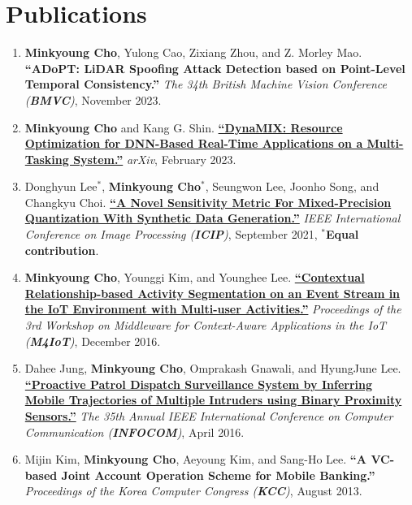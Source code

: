 \documentclass[letterpaper,oneside,11pt]{article}
\begin{document}
\section{Publications}
\begin{enumerate}[leftmargin=*, itemsep=0em]
  \item \small \textbf{Minkyoung Cho}, Yulong Cao, Zixiang Zhou, and Z. Morley Mao.  \textbf{``ADoPT: LiDAR Spoofing Attack Detection based on Point-Level Temporal Consistency.''} \textit{The 34th British Machine Vision Conference (\textbf{BMVC})}, November 2023.
  \item \small \textbf{Minkyoung Cho} and Kang G. Shin.  \textbf{\href{https://arxiv.org/abs/2302.01568}{``DynaMIX: Resource Optimization for DNN-Based Real-Time Applications on a Multi-Tasking System.''}} \textit{arXiv}, February 2023.
  \item \small Donghyun Lee$^\ast$, \textbf{Minkyoung Cho$^\ast$}, Seungwon Lee, Joonho Song, and Changkyu Choi.  \textbf{\href{https://ieeexplore.ieee.org/abstract/document/9506527}{``A Novel Sensitivity Metric For Mixed-Precision Quantization With Synthetic Data Generation.''}} \textit{IEEE International Conference on Image Processing (\textbf{ICIP})}, September 2021, $^\ast$\textbf{Equal contribution}.
  \item \small \textbf{Minkyoung Cho}, Younggi Kim, and Younghee Lee. \textbf{\href{https://dl.acm.org/doi/10.1145/3008631.3008633}{``Contextual Relationship-based Activity Segmentation on an Event Stream in the IoT Environment with Multi-user Activities.''}} \textit{Proceedings of the 3rd Workshop on Middleware for Context-Aware Applications in the IoT (\textbf{M4IoT})}, December 2016.
  \item \small Dahee Jung, \textbf{Minkyoung Cho}, Omprakash Gnawali, and HyungJune Lee. \textbf{\href{https://ieeexplore.ieee.org/abstract/document/7524369}{``Proactive Patrol Dispatch Surveillance System by Inferring Mobile Trajectories of Multiple Intruders using Binary Proximity Sensors.''}} \textit{The 35th Annual IEEE International Conference on Computer Communication (\textbf{INFOCOM})}, April 2016.
  \item \small Mijin Kim, \textbf{Minkyoung Cho}, Aeyoung Kim, and Sang-Ho Lee. \textbf{``A VC-based Joint Account Operation Scheme for Mobile Banking.''} \textit{Proceedings of the Korea Computer Congress (\textbf{KCC})}, August 2013.
\end{enumerate}

\end{document}
